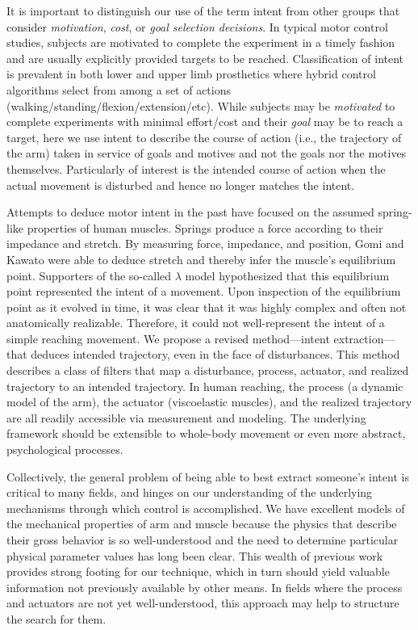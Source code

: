 \documentclass[10pt]{article}
\begin{document}
It is important to distinguish our use of the term intent from other groups that consider \textit{motivation}\cite{mcclelland1985motives, rawolle2013relationships}, \textit{cost}\cite{todorov2002optimal, flash1985coordination}, or \textit{goal selection decisions}\cite{ziebart2010modeling}. In typical motor control studies, subjects are motivated to complete the experiment in a timely fashion and are usually explicitly provided targets to be reached. Classification of intent is prevalent in both lower \cite{strausser2011development, hargrove2013robotic} and upper limb\cite{englehart2003robust, young2012improving} prosthetics where hybrid control algorithms select from among a set of actions (walking/standing/flexion/extension/etc). While subjects may be \textit{motivated} to complete experiments with minimal effort/cost and their \textit{goal} may be to reach a target, here we use intent to describe the course of action (i.e., the trajectory of the arm) taken in service of goals and motives and not the goals nor the motives themselves. Particularly of interest is the intended course of action when the actual movement is disturbed and hence no longer matches the intent.

Attempts to deduce motor intent in the past have focused on the assumed spring-like properties of human muscles. Springs produce a force according to their impedance and stretch. By measuring force, impedance, and position, Gomi and Kawato\cite{gomi1997human} were able to deduce stretch and thereby infer the muscle's equilibrium point. Supporters of the so-called $\lambda$ model\cite{feldman1995origin} hypothesized that this equilibrium point represented the intent of a movement. Upon inspection of the equilibrium point as it evolved in time, it was clear that it was highly complex and often not anatomically realizable. Therefore, it could not well-represent the intent of a simple reaching movement. We propose a revised method---intent extraction---that deduces intended trajectory, even in the face of disturbances. This method describes a class of filters that map a disturbance, process, actuator, and realized trajectory to an intended trajectory. In human reaching, the process (a dynamic model of the arm), the actuator (viscoelastic muscles), and the realized trajectory are all readily accessible via measurement and modeling. The underlying framework should be extensible to whole-body movement or even more abstract, psychological processes.

Collectively, the general problem of being able to best extract someone's intent is critical to many fields, and hinges on our understanding of the underlying mechanisms through which control is accomplished. We have excellent models of the mechanical properties of arm and muscle because the physics that describe their gross behavior is so well-understood and the need to determine particular physical parameter values has long been clear. This wealth of previous work provides strong footing for our technique, which in turn should yield valuable information not previously available by other means. In fields where the process and actuators are not yet well-understood, this approach may help to structure the search for them.
\end{document}
